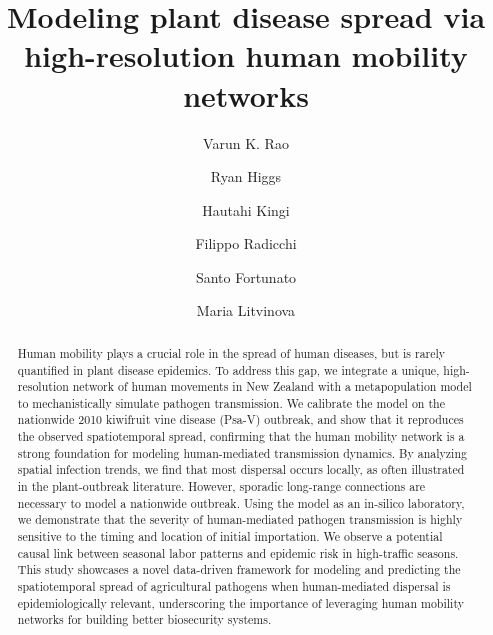\documentclass[aps,physrev,reprint,superscriptaddress]{revtex4-1}
\begin{document}
\title{Modeling plant disease spread via high-resolution human mobility networks}
\author{Varun K. Rao}
\author{Ryan Higgs}
\author{Hautahi Kingi}
\author{Filippo Radicchi}
\author{Santo Fortunato}
\author{Maria Litvinova}



\begin{abstract}
Human mobility plays a crucial role in the spread of human diseases, but is rarely quantified in plant disease epidemics. 
To address this gap, we integrate a unique, high-resolution network of human movements in New Zealand with a metapopulation model to mechanistically simulate pathogen transmission. 
We calibrate the model on the nationwide 2010 kiwifruit vine disease (Psa-V) outbreak, and show that it reproduces the observed spatiotemporal spread, confirming that the human mobility network is a strong foundation for modeling human-mediated transmission dynamics. By analyzing spatial infection trends, we find that most dispersal occurs locally, as often illustrated in the plant-outbreak literature. However, sporadic long-range connections are necessary to model a nationwide outbreak.
Using the model as an in-silico laboratory, we demonstrate that the severity of human-mediated pathogen transmission is highly sensitive to the timing and location of initial importation. We observe a potential causal link between seasonal labor patterns and epidemic risk in high-traffic seasons. 
This study showcases a novel data-driven framework for modeling and predicting the spatiotemporal spread of agricultural pathogens when human-mediated dispersal is epidemiologically relevant, underscoring the importance of leveraging human mobility networks for building better biosecurity systems. 
\end{abstract}
\end{document}
